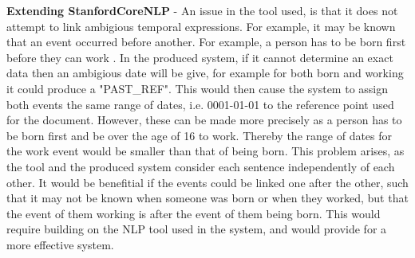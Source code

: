 \par \textbf{Extending StanfordCoreNLP} - An issue in the tool used, is that it does not attempt to link ambigious temporal expressions. For example, it may be known that an event occurred before another. For example, a person has to be born first before they can work \cite{mccloskymanning2012}. In the produced system, if it cannot determine an exact data then an ambigious date will be give, for example for both born and working it could produce a "PAST\_REF". This would then cause the system to assign both events the same range of dates, i.e. 0001-01-01 to the reference point used for the document. However, these can be made more precisely as a person has to be born first and be over the age of 16 to work. Thereby the range of dates for the work event would be smaller than that of being born. This problem arises, as the tool and the produced system consider each sentence independently of each other. It would be benefitial if the events could be linked one after the other, such that it may not be known when someone was born or when they worked, but that the event of them working is after the event of them being born. This would require building on the NLP tool used in the system, and would provide for a more effective system.